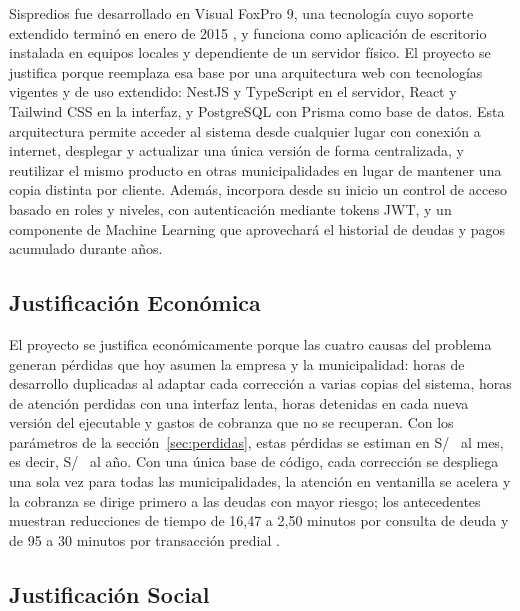 \documentclass[12pt,a4paper]{report}
\newcommand{\soles}[1]{\edef\tmpval{\fpeval{round(#1,2)}}S/~\pgfmathprintnumber{\tmpval}}
\begin{document}
Sispredios fue desarrollado en Visual FoxPro 9, una tecnología cuyo soporte extendido terminó en enero de 2015 \parencite{taft2007}, y funciona como aplicación de escritorio instalada en equipos locales y dependiente de un servidor físico. El proyecto se justifica porque reemplaza esa base por una arquitectura web con tecnologías vigentes y de uso extendido: NestJS y TypeScript en el servidor, React y Tailwind CSS en la interfaz, y PostgreSQL con Prisma como base de datos. Esta arquitectura permite acceder al sistema desde cualquier lugar con conexión a internet, desplegar y actualizar una única versión de forma centralizada, y reutilizar el mismo producto en otras municipalidades en lugar de mantener una copia distinta por cliente. Además, incorpora desde su inicio un control de acceso basado en roles y niveles, con autenticación mediante tokens JWT, y un componente de Machine Learning que aprovechará el historial de deudas y pagos acumulado durante años.

\subsection{Justificación Económica}
\label{sec:just-econ}

El proyecto se justifica económicamente porque las cuatro causas del problema generan pérdidas que hoy asumen la empresa y la municipalidad: horas de desarrollo duplicadas al adaptar cada corrección a varias copias del sistema, horas de atención perdidas con una interfaz lenta, horas detenidas en cada nueva versión del ejecutable y gastos de cobranza que no se recuperan. Con los parámetros de la sección~\ref{sec:perdidas}, estas pérdidas se estiman en \soles{\PerdMes} al mes, es decir, \soles{\PerdAnio} al año. Con una única base de código, cada corrección se despliega una sola vez para todas las municipalidades, la atención en ventanilla se acelera y la cobranza se dirige primero a las deudas con mayor riesgo; los antecedentes muestran reducciones de tiempo de 16,47 a 2,50 minutos por consulta de deuda \parencite{laulate2025} y de 95 a 30 minutos por transacción predial \parencite{omorog2022}.

\subsection{Justificación Social}
\end{document}
